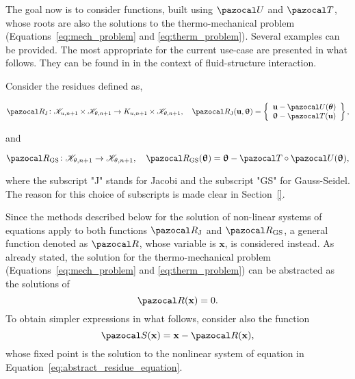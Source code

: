 The goal now is to consider functions, built using \(\pazocal U\) and \(\pazocal T\), whose roots are also the solutions to the thermo-mechanical problem (Equations~\eqref{eq:mech_problem} and \eqref{eq:therm_problem}).
Several examples can be provided.
The most appropriate for the current use-case are presented in what follows.
They can be found in \cite{uekermann_partitioned_2016} in the context of fluid-structure interaction.

Consider the residues defined as,
\begin{highlight}
\begin{equation} \label{eq:def_res_jacobi}
  \pazocal R_\text{J}\colon \mathscr K_{u,n+1}\times\mathscr K_{\theta,n+1} \to K_{u,n+1}\times\mathscr K_{\theta,n+1},\quad  \pazocal R_\text{J}(\mathbf u, \bm \uptheta) =
  \left\{\begin{array}{c}
  \mathbf u - \pazocal U(\bm \theta)\\
  \bm \uptheta - \pazocal T(\mathbf u)
  \end{array}\right\},
\end{equation}
\end{highlight}
and
\begin{highlight}
\begin{equation} \label{eq:def_res_gauss_seidel}
  \pazocal R_\text{GS}\colon \mathscr K_{\theta,n+1} \to\mathscr K_{\theta,n+1},\quad \pazocal R_\text{GS}(\bm \uptheta) =
  \bm \uptheta - \pazocal T\circ \pazocal U(\bm \uptheta),
\end{equation}
\end{highlight}
where the subscript "J" stands for Jacobi and the subscript "GS" for Gauss-Seidel.
The reason for this choice of subscripts is made clear in Section~\ref{}.


Since the methods described below for the solution of non-linear systems of equations apply to both functions \(\pazocal R_\mathrm{J}\) and \(\pazocal R_\mathrm{GS}\), a general function denoted as \(\pazocal R\), whose variable is \(\mathbf x\), is considered instead.
As already stated, the solution for the thermo-mechanical problem (Equations~\eqref{eq:mech_problem} and \eqref{eq:therm_problem}) can be abstracted as the solutions of
\begin{equation} \label{eq:abstract_residue_equation}
  \pazocal R(\mathbf x) = 0.
\end{equation}
To obtain simpler expressions in what follows, consider also the function
\begin{equation}
\pazocal S(\mathbf x) = \mathbf x - \pazocal R(\mathbf x),
\end{equation}
whose fixed point is the solution to the nonlinear system of equation in Equation~\eqref{eq:abstract_residue_equation}.

